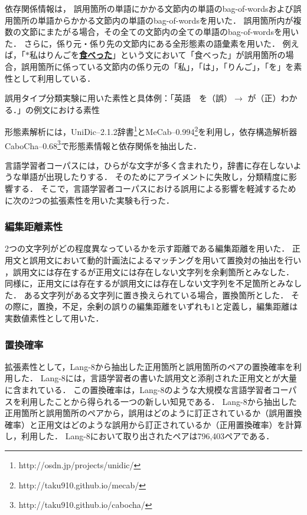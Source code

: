 \documentclass[japanese]{jnlp_1.4}
\begin{document}
依存関係情報は，
誤用箇所の単語にかかる文節内の単語のbag-of-wordsおよび誤用箇所の単語からかかる文節内の単語のbag-of-wordsを用いた．
誤用箇所内が複数の文節にまたがる場合，その全ての文節内の全ての単語のbag-of-wordsを用いた．
さらに，係り元・係り先の文節内にある全形態素の語彙素を用いた．
例えば，「$\ast$私はりんごを\underline{{\bf 食べった}}」という文において「食べった」が誤用箇所の場合，誤用箇所に係っている文節内の係り元の「私」，「は」，「りんご」，「を」を素性として利用している．

\begin{table}[t]
\caption{誤用タイプ分類実験に用いた素性と具体例：「英語　を（誤）$\rightarrow$ が（正）わかる．」の例文における素性}
\label{tbl:features}

\end{table}

形態素解析には，UniDic--2.1.2辞書\footnote{http://osdn.jp/projects/unidic/}とMeCab--0.994\footnote{http://taku910.github.io/mecab/}を利用し，依存構造解析器 CaboCha--0.68\footnote{http://taku910.github.io/cabocha/}で形態素情報と依存関係を抽出した．

言語学習者コーパスには，ひらがな文字が多く含まれたり，辞書に存在しないような単語が出現したりする．
そのためにアライメントに失敗し，分類精度に影響する．
そこで，言語学習者コーパスにおける誤用による影響を軽減するために次の2つの拡張素性を用いた実験も行った．


\subsubsection*{編集距離素性}

2つの文字列がどの程度異なっているかを示す距離である編集距離を用いた．
正用文と誤用文において動的計画法によるマッチングを用いて置換対の抽出を行い \cite{fujinoj}，誤用文には存在するが正用文には存在しない文字列を余剰箇所とみなした．
同様に，正用文には存在するが誤用文には存在しない文字列を不足箇所とみなした．
ある文字列がある文字列に置き換えられている場合，置換箇所とした．
その際に，置換，不足，余剰の誤りの編集距離をいずれも1と定義し，編集距離は実数値素性として用いた．


\subsubsection*{置換確率}

拡張素性として，Lang-8から抽出した正用箇所と誤用箇所のペアの置換確率を利用した．
Lang-8には，言語学習者の書いた誤用文と添削された正用文とが大量に含まれている．
この置換確率は，Lang-8のような大規模な言語学習者コーパスを利用したことから得られる一つの新しい知見である．
Lang-8から抽出した正用箇所と誤用箇所のペアから，誤用はどのように訂正されているか（誤用置換確率）と正用文はどのような誤用から訂正されているか（正用置換確率）を計算し，利用した．
Lang-8において取り出されたペアは796,403ペアである．
\end{document}
